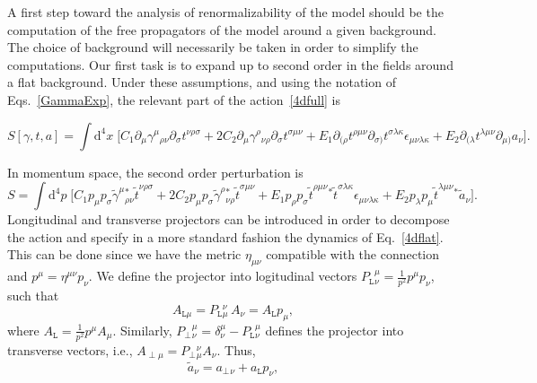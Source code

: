 \documentclass[aps,prd,12pt,twocolumn,superscriptaddress,showpacs,showkeys,reprint%
]{revtex4-1}
\renewcommand{\(}{\left(}
\renewcommand{\)}{\right)}
\renewcommand{\[}{\left[}
\renewcommand{\]}{\right]}
\newcommand{\dn}[2]{{\mathrm{d}}^{#1}{#2}\;}
\begin{document}
A first step toward the analysis of renormalizability of the model should be the computation of the free propagators of the model around a given background. The choice of background will necessarily be taken in order to simplify the computations.  Our first task is to expand up to second order in the fields around a flat background. Under these assumptions, and using the notation of Eqs.~\eqref{GammaExp}, the relevant part of the action~\eqref{4dfull} is
\begin{widetext}
  \begin{dmath}[compact, spread=2pt]
    \label{4dflatx}
    S[\gamma,t,a] =
    \int\dn{4}{x} \bigg[
      C_1 \partial_{\mu}\gamma^{\mu}{}_{\rho\nu} \partial_\sigma t^{\nu\rho\sigma}
      +2 C_2 \partial_{\mu}\gamma^{\rho}{}_{\nu\rho} \partial_\sigma t^{\sigma\mu\nu}
      + E_1 \partial_{(\rho}t^{\rho\mu\nu}\partial_{\sigma)}t^{\sigma\lambda\kappa}\epsilon_{\mu\nu\lambda\kappa}
      + E_2 \partial_{(\lambda} t^{\lambda\mu\nu}\partial_{\mu)} a_\nu
      \bigg].
  \end{dmath}
\end{widetext}
In momentum space, the second order perturbation is
\begin{dmath}[compact, spread=2pt]
  \label{4dflat}
  S =
  \int\dn{4}{p}\bigg[
    C_1 p_{\mu} p_\sigma\tilde\gamma^{\mu}{}_{\rho\nu}^* \tilde t^{\nu\rho\sigma}
    + 2 C_2 p_{\mu} p_\sigma\tilde\gamma^{\rho}{}_{\nu\rho}^* \tilde t^{\sigma\mu\nu}
    + E_1 p_{\rho} p_{\sigma} \tilde t^{\rho\mu\nu}{}^*\tilde t^{\sigma\lambda\kappa} \epsilon_{\mu\nu\lambda\kappa}
    + E_2 p_{\lambda} p_{\mu} \tilde t^{\lambda\mu\nu}{}^* \tilde a_\nu
    \bigg].
\end{dmath}
Longitudinal and transverse projectors can be introduced in order to decompose the action and specify in a more standard fashion the dynamics of Eq.~\eqref{4dflat}. This can be done since we have the metric $\eta_{\mu\nu}$ compatible with the connection and $p^\mu = \eta^{\mu\nu}p_\nu$. We define the projector into logitudinal vectors $P_{\texttt{L}}{}^\mu_\nu = \tfrac{1}{p^2}p^\mu p_\nu $, such that $$A_{\texttt{L}\mu} = P_{\texttt{L}}{}^\nu_\mu \, A_\nu = A_{\texttt{L}}{}p_{\mu},$$ where $A_{\texttt{L}}=\tfrac{1}{p^2} p^\mu A_\mu$. Similarly, $P_\perp{}^\mu_\nu=\delta^\mu_\nu -P_{\texttt{L}}{}^\mu_\nu$ defines the projector into transverse vectors, i.e., $A_{\perp \mu}=P_{\perp}{}_\mu^\nu A_\nu$. Thus,
\begin{dmath}
  \label{transversea}
  \tilde a_\nu=a_\perp{}_{\nu}+a_{\texttt{L}} p_\nu,
\end{dmath}
\end{document}
